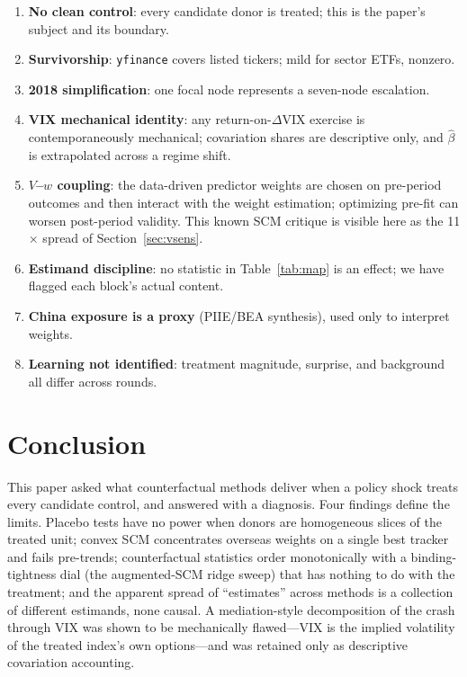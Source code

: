 \documentclass[11pt,a4paper]{article}
\begin{document}
\begin{enumerate}
  \item \textbf{No clean control}: every candidate donor is treated;
  this is the paper's subject and its boundary.
  \item \textbf{Survivorship}: \texttt{yfinance} covers listed tickers;
  mild for sector ETFs, nonzero.
  \item \textbf{2018 simplification}: one focal node represents a
  seven-node escalation.
  \item \textbf{VIX mechanical identity}: any return-on-$\Delta$VIX
  exercise is contemporaneously mechanical; covariation shares are
  descriptive only, and $\hat\beta$ is extrapolated across a regime
  shift.
  \item \textbf{$V$--$w$ coupling}: the data-driven predictor weights are
  chosen on pre-period outcomes and then interact with the weight
  estimation; optimizing pre-fit can worsen post-period validity. This
  known SCM critique is visible here as the 11$\times$ spread of
  Section~\ref{sec:vsens}.
  \item \textbf{Estimand discipline}: no statistic in
  Table~\ref{tab:map} is an effect; we have flagged each block's actual
  content.
  \item \textbf{China exposure is a proxy} (PIIE/BEA synthesis), used
  only to interpret weights.
  \item \textbf{Learning not identified}: treatment magnitude, surprise,
  and background all differ across rounds.
\end{enumerate}

\section{Conclusion}\label{sec:conclusion}

This paper asked what counterfactual methods deliver when a policy shock
treats every candidate control, and answered with a diagnosis. Four
findings define the limits. Placebo tests have no power when donors are
homogeneous slices of the treated unit; convex SCM concentrates overseas
weights on a single best tracker and fails pre-trends; counterfactual
statistics order monotonically with a binding-tightness dial (the
augmented-SCM ridge sweep) that has nothing to do with the treatment; and
the apparent spread of ``estimates'' across methods is a collection of
different estimands, none causal. A mediation-style decomposition of the
crash through VIX was shown to be mechanically flawed---VIX is the
implied volatility of the treated index's own options---and was retained
only as descriptive covariation accounting.
\end{document}
